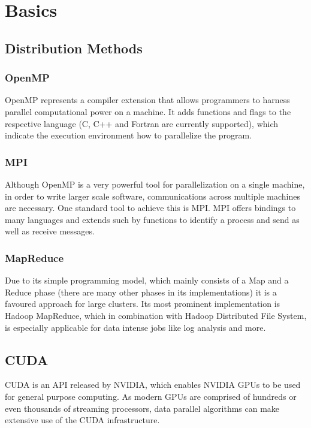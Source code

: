 \chapter{Basics}

\section{Distribution Methods}

\subsection{OpenMP}
OpenMP represents a compiler extension that allows programmers to harness parallel computational power on a machine. It adds functions and flags to the respective language (C, C++ and Fortran are currently supported), which indicate the execution environment how to parallelize the program.

\subsection{MPI}
Although OpenMP is a very powerful tool for parallelization on a single machine, in order to write larger scale software, communications across multiple machines are necessary. One standard tool to achieve this is MPI.
MPI offers bindings to many languages and extends such by functions to identify a process and send as well as receive messages.

\subsection{MapReduce}
Due to its simple programming model, which mainly consists of a Map and a Reduce phase (there are many other phases in its implementations) it is a favoured approach for large clusters. Its most prominent implementation is Hadoop MapReduce, which in combination with Hadoop Distributed File System, is especially applicable for data intense jobs like log analysis and more.

\section{CUDA}

CUDA is an API released by NVIDIA, which enables NVIDIA GPUs to be used for general purpose computing. As modern GPUs are comprised of hundreds or even thousands of streaming processors, data parallel algorithms can make extensive use of the CUDA infrastructure.

